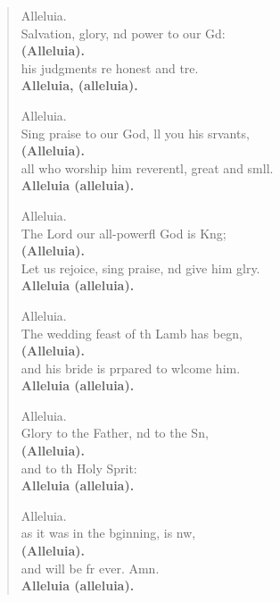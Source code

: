 \settowidth{\versewidth}{all who worship him reverently, great and small   *}
\begin{verse}%
  \begin{patverse}
Alleluia.\\
Salvation, glory, nd power to our Gd:\Med\\
\textbf{(Alleluia).}\\
his judgments re honest and tre.\Med\\
\textbf{Alleluia, (alleluia).}

Alleluia.\\
Sing praise to our God, ll you his srvants,\Med\\
\textbf{(Alleluia).}\\
all who worship him reverentl, great and smll.\Med\\
\textbf{Alleluia (alleluia).}

Alleluia.\\
The Lord our all-powerfl God is K\pointup{\i}ng;\Med\\
\textbf{(Alleluia).}\\
Let us rejoice, sing praise, nd give him glry.\Med\\
\textbf{Alleluia (alleluia).}

Alleluia.\\
The wedding feast of th Lamb has begn,\Med\\
\textbf{(Alleluia).}\\
and his bride is prpared to wlcome him.\Med\\
\textbf{Alleluia (alleluia).}

Alleluia.\\
Glory to the Father, nd to the Sn,\Med\\
\textbf{(Alleluia).}\\
and to th Holy Sp\pointup{\i}rit:\Med\\
\textbf{Alleluia (alleluia).}

Alleluia.\\
as it was in the bginning, is nw,\Med\\
\textbf{(Alleluia).}\\
and will be fr ever. Amn.\Med\\
\textbf{Alleluia (alleluia).}
  \end{patverse}
  \end{verse}
